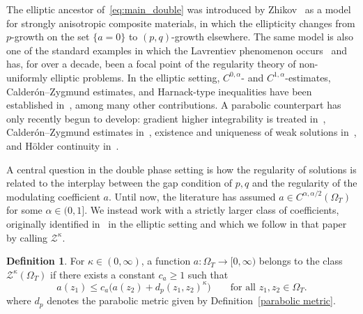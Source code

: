 \documentclass[notitlepage,11pt,reqno]{amsart}
\theoremstyle{definition}
\newtheorem{definition}[theorem]{Definition}
\numberwithin{equation}{section}
\begin{document}
The elliptic ancestor of~\eqref{eq:main_double} was introduced by
Zhikov~\cite{Zhikov1986, Zhikov1993, Zhikov1995, Zhikov1997} as a model for
strongly anisotropic composite materials, in which the ellipticity changes
from $p$-growth on the set $\{a = 0\}$ to $(p, q)$-growth elsewhere. The
same model is also one of the standard examples in which the Lavrentiev
phenomenon occurs~\cite{Esposito2004, Fonseca2004, Zhikov1993, Zhikov1995} and has,
for over a decade, been a focal point of the regularity theory of
non-uniformly elliptic problems. In the elliptic setting,
$C^{0, \alpha}$- and $C^{1, \alpha}$-estimates, Calder\'on--Zygmund
estimates, and Harnack-type inequalities have been established
in~\cite{Baroni2015, Colombo2015, Colombo2015a, Colombo2016, DeFilippis2019,
Baasandorj2020, Byun2020, Byun2017}, among many other contributions. A
parabolic counterpart has only recently begun to develop: gradient higher integrability is treated
in~\cite{2023_Gradient_Higher_Integrability_for_Degenerate_Parabolic_Double-Phase_Systems,
KS24, S25, KO2025, kim2026interpolativerefinementgapbound, oh2026gradienthigherintegrabilitydegenerate, arora2026irregulardoublephaseevolution}, Calder\'on--Zygmund estimates in~\cite{kim2024calderonzygmundtypeestimateparabolic,
kim2025calderonzygmundtypeestimatesingular}, existence and uniqueness of
weak solutions in~\cite{ST16, KimLipschitz25}, and H\"older continuity
in~\cite{Kim2025holder}.

A central question in the double phase setting is how the regularity of solutions is related to
the interplay between the gap condition of $p, q$ and the regularity of the
modulating coefficient $a$. Until now, the literature has assumed $a \in C^{\alpha,
\alpha/2}(\Omega_T)$ for some $\alpha \in (0, 1]$. We instead work with a
strictly larger class of coefficients, originally identified
in~\cite{BCFM2023} in the elliptic setting and which we follow in that paper
by calling $\mathcal{Z}^{\kappa}$.

\begin{definition}\label{def:Zkappa}
For $\kappa \in (0, \infty)$, a function $a : \Omega_T \to [0, \infty)$
belongs to the class $\mathcal{Z}^{\kappa}(\Omega_T)$ if there exists a
constant $c_a \ge 1$ such that
\begin{equation}\label{eq:Z_kappa}
  a(z_1) \le c_a\bigl(a(z_2) + d_p(z_1,z_2)^{\kappa}\bigr)
  \qquad \text{for all } z_1, z_2 \in \Omega_T.
\end{equation}
where $d_p$ denotes the parabolic metric given by Definition~\ref{parabolic metric}.
\end{definition}
\end{document}
